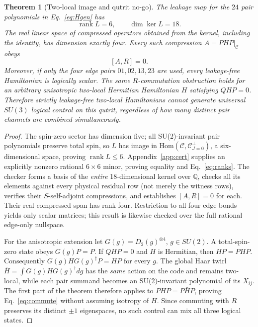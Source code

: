 \documentclass[aps,pra,twocolumn,nofootinbib,superscriptaddress,10pt]{revtex4-2}
\newtheorem{theorem}{Theorem}
\newcommand{\Cc}{\mathcal C}\newcommand{\HH}{\mathcal H}\newcommand{\Id}{\mathbb I}
\begin{document}
\begin{theorem}[Two-local image and qutrit no-go]\label{thm:nogo}
The leakage map for the $24$ pair polynomials in Eq.~\eqref{eq:Hgen} has
\begin{equation}\label{eq:ranks}
\boxed{\operatorname{rank}L=6,\qquad\dim\ker L=18.}
\end{equation}
The real linear space of compressed operators obtained from the kernel, including the identity, has dimension exactly four. Every such compression $A=PHP\vert_\Cc$ obeys
\begin{equation}\label{eq:commute}
\boxed{[A,R]=0.}
\end{equation}
Moreover, if only the four \emph{edge} pairs $01,02,13,23$ are used, every leakage-free Hamiltonian is logically scalar. The same $R$-commutation obstruction holds for an arbitrary \emph{anisotropic} two-local Hermitian Hamiltonian $H$ satisfying $QHP=0$. Therefore strictly leakage-free two-local Hamiltonians cannot generate universal $SU(3)$ logical control on this qutrit, regardless of how many distinct pair channels are combined simultaneously.
\end{theorem}
\begin{proof}
The spin-zero sector has dimension five; all SU(2)-invariant pair polynomials preserve total spin, so $L$ has image in $\mathrm{Hom}(\Cc,\Cc_{J=0}^{\perp})$, a six-dimensional space, proving $\operatorname{rank}L\le6$. Appendix~\ref{app:cert} supplies an explicitly nonzero rational $6\times6$ minor, proving equality and Eq.~\eqref{eq:ranks}. The checker forms a basis of the \emph{entire} 18-dimensional kernel over $\mathbb Q$, checks all its elements against every physical residual row (not merely the witness rows), verifies their $S$-self-adjoint compressions, and establishes $[A,R]=0$ for each. Their real compressed span has rank four. Restriction to all four edge bonds yields only scalar matrices; this result is likewise checked over the full rational edge-only nullspace.

For the anisotropic extension let $G(g)=D_2(g)^{\otimes4}$, $g\in SU(2)$. A total-spin-zero state obeys $G(g)P=P$. If $QHP=0$ and $H$ is Hermitian, then $HP=PHP$. Consequently $G(g)HG(g)^\dagger P=HP$ for every $g$. The global Haar twirl $\bar H=\int G(g)HG(g)^\dagger dg$ has the \emph{same} action on the code and remains two-local, while each pair summand becomes an SU(2)-invariant polynomial of its $X_{ij}$. The first part of the theorem therefore applies to $PHP=P\bar HP$, proving Eq.~\eqref{eq:commute} without assuming isotropy of $H$. Since commuting with $R$ preserves its distinct $\pm1$ eigenspaces, no such control can mix all three logical states.\end{proof}
\end{document}
